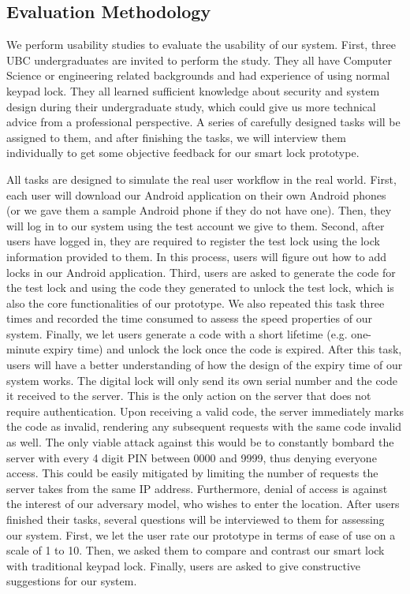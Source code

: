 \documentclass[conference]{IEEEtran}
\begin{document}
\subsection{Evaluation Methodology}
We perform usability studies to evaluate the usability of our system. First, three UBC undergraduates are invited to perform the study. They all have Computer Science or engineering related backgrounds and had experience of using normal keypad lock. They all learned sufficient knowledge about security and system design during their undergraduate study, which could give us more technical advice from a professional perspective.  A series of carefully designed tasks will be assigned to them, and after finishing the tasks, we will interview them individually to get some objective feedback for our smart lock prototype.

All tasks are designed to simulate the real user workflow in the real world. First, each user will download our Android application on their own Android phones (or we gave them a sample Android phone if they do not have one). Then, they will log in to our system using the test account we give to them. Second, after users have logged in, they are required to register the test lock using the lock information provided to them. In this process, users will figure out how to add locks in our Android application. Third, users are asked to generate the code for the test lock and using the code they generated to unlock the test lock, which is also the core functionalities of our prototype. We also repeated this task three times and recorded the time consumed to assess the speed properties of our system.  Finally, we let users generate a code with a short lifetime (e.g. one-minute expiry time) and unlock the lock once the code is expired. After this task, users will have a better understanding of how the design of the expiry time of our system works.
The digital lock will only send its own serial number and the code it received to the server. This is the only action on the server that does not require authentication. Upon receiving a valid code, the server immediately marks the code as invalid, rendering any subsequent requests with the same code invalid as well. The only viable attack against this would be to constantly bombard the server with every 4 digit PIN between 0000 and 9999, thus denying everyone access. This could be easily mitigated by limiting the number of requests the server takes from the same IP address. Furthermore, denial of access is against the interest of our adversary model, who wishes to enter the location.
After users finished their tasks, several questions will be interviewed to them for assessing our system. First, we let the user rate our prototype in terms of ease of use on a scale of 1 to 10. Then, we asked them to compare and contrast our smart lock with traditional keypad lock.  Finally, users are asked to give constructive suggestions for our system.
\end{document}
